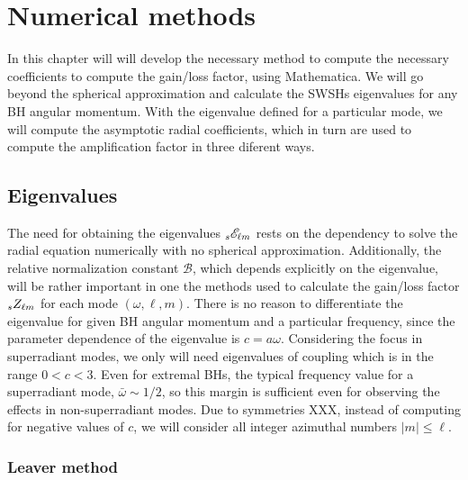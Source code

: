 
\chapter{Numerical methods} %
\label{Chapter4}

In this chapter will will develop the necessary method to compute the necessary coefficients to compute the gain/loss factor, using Mathematica\texttrademark.
We will go beyond the spherical approximation and calculate the SWSHs eigenvalues for any BH angular momentum.
With the eigenvalue defined for a particular mode, we will compute the asymptotic radial coefficients, which in turn are used to compute the amplification factor in three diferent ways.

\section{Eigenvalues}

The need for obtaining the eigenvalues $\uu[s]{\mathscr{E}}{\ell m}$ rests on the dependency to solve the radial equation numerically with no spherical approximation.
Additionally, the relative normalization constant $\mathscr{B}$, which depends explicitly on the eigenvalue, will be rather important in one the methods used to calculate the gain/loss factor $\uu[s]{Z}{\ell m}$ for each mode $(\omega,\ell,m)$.
There is no reason to differentiate the eigenvalue for given BH angular momentum and a particular frequency, since the parameter dependence of the eigenvalue is $c=a\omega$.
Considering the focus in superradiant modes, we only will need eigenvalues of coupling which is in the range $0<c<3$. 
Even for extremal BHs, the typical frequency value for a superradiant mode, $\bar{\omega}\sim 1/2$, so this margin is sufficient even for observing the effects in non-superradiant modes.
Due to symmetries XXX, instead of computing for negative values of $c$, we will consider all integer azimuthal numbers $|m|\le \ell$.

\subsection{Leaver method}

